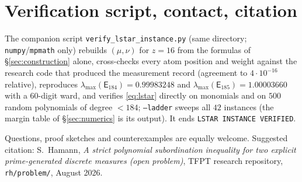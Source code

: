 \documentclass[11pt]{article}
\theoremstyle{remark}
\newcommand{\E}{\mathsf{E}}
\begin{document}
\section{Verification script, contact, citation}\label{sec:script}

The companion script \texttt{verify\_lstar\_instance.py} (same
directory; \texttt{numpy}/\texttt{mpmath} only) rebuilds
$(\mu,\nu)$ for $z=16$ from the formulas of
\S\ref{sec:construction} alone, cross-checks every atom position and
weight against the research code that produced the measurement record
(agreement to $4\cdot10^{-16}$ relative), reproduces
$\lambda_{\max}(\E_{184})=0.99983248$ and
$\lambda_{\max}(\E_{185})=1.00003660$ with a $60$-digit ward, and
verifies \eqref{eq:lstar} directly on monomials and on $500$ random
polynomials of degree $<184$; \texttt{--ladder} sweeps all $42$
instances (the margin table of \S\ref{sec:numerics} is its output).
It ends \texttt{LSTAR INSTANCE VERIFIED}.

\medskip\noindent
Questions, proof sketches and counterexamples are equally welcome.
Suggested citation: S.~Hamann, \emph{A strict polynomial
subordination inequality for two explicit prime-generated discrete
measures (open problem)}, TFPT research repository,
\texttt{rh/problem/}, August 2026.
\end{document}
